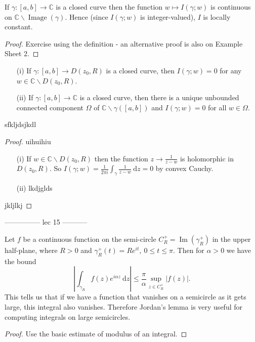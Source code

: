 \documentclass[egregdoesnotlikesansseriftitles,a4paper]{scrartcl}
\begin{document}
\begin{proposition}
      If $\gamma: [a,b] \rightarrow \mathbb{C}$ is a closed curve then the function $w \mapsto I (\gamma;w)$ is continuous on $\mathbb{C}\backslash \operatorname{Image}(\gamma)$. Hence (since $I(\gamma; w)$ is integer-valued), $I$ is locally constant.
      \begin{proof}
            Exercise using the definition - an alternative proof is also on Example Sheet 2.
      \end{proof}
\end{proposition}
\begin{proposition}
      \begin{itemize}
           \item[(i)] If $\gamma: [a,b] \rightarrow D (z_0 ,R)$ is a closed curve, then $I (\gamma;w)=0$ for any $w \in \mathbb{C}\backslash D (z_0 ,R)$.
           \item[(ii)] If $\gamma: [a,b] \rightarrow \mathbb{C}$ is a closed curve, then there is a unique unbounded connected component $\Omega$ of $\mathbb{C}\backslash \gamma ([a,b])$ and $I (\gamma; w)=0$ for all $w \in \Omega$.
      \end{itemize}
      sfkljdsjkdl
      \begin{proof}
          uihuihiu
            \begin{itemize}
                 \item[(i)] If $w \in \mathbb{C}\backslash D (z_0 ,R)$ then the function $z \rightarrow \frac{1}{z-w}$ is holomorphic in $D (z_0 ,R)$. So $I (\gamma; w)=\frac{1}{2 \pi i}\int_{\gamma}^{} \frac{1}{z-w}\ \mathrm{d}z =0$ by convex Cauchy.
                 \item[(ii)] lkdjglds
            \end{itemize}
            jkljlkj
      \end{proof}
\end{proposition}
---------------
lec 15
-----------
\begin{lemma}
      Let $f$ be a continuous function on the semi-circle $C_{R}^{+}=\operatorname{Im}(\gamma_{R}^{+})$ in the upper half-plane, where $R >0$ and $\gamma_{R}^{+}(t)=Re^{it}, \ 0 \leq t \leq  \pi$. Then for $\alpha >0$ we have the bound \[
      \left|\int_{\gamma_{R}}^{} f (z)e^{i \alpha z}\ \mathrm{d}z \right| \leq \frac{\pi}{\alpha}\sup_{z \in C_{R}^{+}}\left|f (z)\right|
      .\] This tells us that if we have a function that vanishes on a semicircle as it gets large, this integral also vanishes. Therefore Jordan's lemma is very useful for computing integrals on large semicircles.
      \begin{proof}
            Use the basic estimate of modulus of an integral.
      \end{proof}
\end{lemma}
\end{document}
